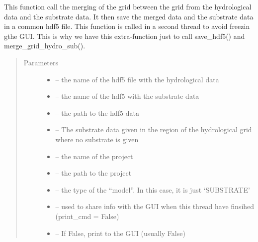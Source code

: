 \documentclass[letterpaper,10pt,english]{sphinxmanual}
\begin{document}
\begin{fulllineitems}
\label{\detokenize{index:src.mesh_grid2.merge_grid_and_save}}
This function call the merging of the grid between the grid from the hydrological data and the substrate data.
It then save the merged data and the substrate data in a common hdf5 file. This function is called in a second
thread to avoid freezin gthe GUI. This is why we have this extra-function just to call save\_hdf5() and
merge\_grid\_hydro\_sub().
\begin{quote}\begin{description}
\item[{Parameters}] \leavevmode\begin{itemize}
\item {} 
 -- the name of the hdf5 file with the hydrological data

\item {} 
 -- the name of the hdf5 with the substrate data

\item {} 
 -- the path to the hdf5 data

\item {} 
 -- The substrate data given in the region of the hydrological grid where no substrate is given

\item {} 
 -- the name of the project

\item {} 
 -- the path to the project

\item {} 
 -- the type of the ``model''. In this case, it is just `SUBSTRATE'

\item {} 
 -- used to share info with the GUI when this thread have finsihed (print\_cmd = False)

\item {} 
 -- If False, print to the GUI (usually False)

\end{itemize}

\end{description}\end{quote}

\end{fulllineitems}
\end{document}
